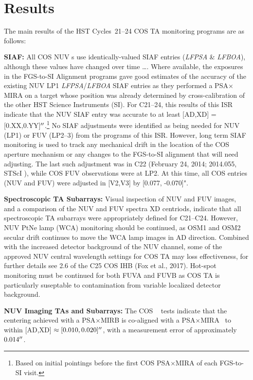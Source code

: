 \section{Results}\label{sec:results}
The main results of the HST Cycles~21--24 COS TA monitoring programs are as follows:
\begin{description}
\item{\bf SIAF:}{
	All COS NUV s use identically-valued SIAF entries ({\it LFPSA} \& {\it LFBOA}), although these values have changed over time \dots.
	Where available, the exposures in the FGS-to-SI Alignment programs gave good estimates of the accuracy of the existing NUV LP1 {\it LFPSA}/{\it LFBOA} SIAF entries
	as they performed a PSA$\times$MIRA  on a target whose position was already determined by cross-calibration of the other HST Science Instruments (SI).
	For C21--24, this results of this ISR indicate that the NUV SIAF entry was accurate to at least [AD,XD] = [0.XX,0.YY]$\hbox{$^{\prime\prime}$}$.\footnote{Based on initial pointings before the first COS PSA$\times$MIRA  of each FGS-to-SI visit.}
	No SIAF adjustments were identified as being needed for NUV (LP1) or FUV (LP2--3) from the programs of this ISR.
	However, long term SIAF monitoring is used to track any mechanical drift in the location of the COS aperture mechanism or any changes to the FGS-to-SI alignment that will need adjusting.
	The last such adjustment was in C22 (February 24, 2014; 2014.055, STScI ), while COS FUV observations were at LP2. At this time, all COS entries (NUV and FUV) were adjusted in [V2,V3] by [0.077, -0.070]".
}
\item{\bf Spectroscopic TA Subarrays:} Visual inspection of NUV and FUV images, and a comparison of the NUV and FUV spectra XD centriods, indicate that all spectroscopic TA subarrays were appropriately defined for C21--C24.
	However, NUV PtNe lamp (WCA) monitoring should be continued, as OSM1 and OSM2 secular drift continues to move the WCA lamp images in AD direction. Combined with the increased
	detector background of the NUV channel, some of the approved NUV central wavelength settings for COS TA
	may loss effectiveness, for further details see 2.6 of the C25 COS IHB (Fox et al., 2017).
	Hot-spot monitoring must be continued for both FUVA and FUVB as COS TA is particularly suseptable to contamination from variable localized detector background.
\item{\bf NUV Imaging TAs and Subarrays:}
	The COS ~ tests indicate that the centering achieved with a PSA$\times$MIRB  is co-aligned with a PSA$\times$MIRA ~to within [AD,XD] $\approx [0.010,0.020]\hbox{$^{\prime\prime}$}$, with a measurement error of approximately $0.014\hbox{$^{\prime\prime}$}$.

\end{description}
